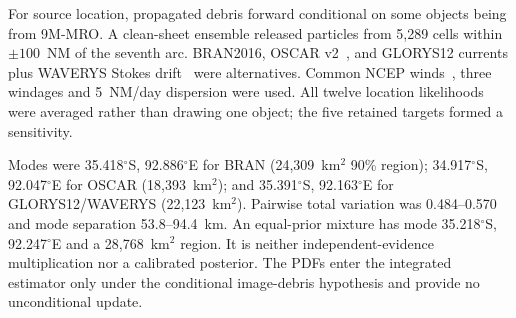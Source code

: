 For source location, \citet{griffin2017drift} propagated debris forward
conditional on some objects being from 9M-MRO. A clean-sheet ensemble released
particles from 5,289 cells within $\pm100$~NM of the seventh arc. BRAN2016,
OSCAR v2~\citep{dohan2021oscar}, and GLORYS12 currents plus WAVERYS Stokes
drift~\citep{copernicus2023glorys12,copernicus2024waverys} were alternatives.
Common NCEP winds~\citep{kalnay1996reanalysis}, three windages and 5~NM/day
dispersion were used. All twelve location likelihoods were averaged rather than
drawing one object; the five retained targets formed a sensitivity.

Modes were 35.418$^{\circ}$S, 92.886$^{\circ}$E for BRAN
(24,309~km$^2$ 90\% region); 34.917$^{\circ}$S, 92.047$^{\circ}$E for OSCAR
(18,393~km$^2$); and 35.391$^{\circ}$S, 92.163$^{\circ}$E for
GLORYS12/WAVERYS (22,123~km$^2$). Pairwise total variation was 0.484--0.570 and
mode separation 53.8--94.4~km. An equal-prior mixture has mode
35.218$^{\circ}$S, 92.247$^{\circ}$E and a 28,768~km$^2$ region. It is
neither independent-evidence multiplication nor a calibrated posterior. The
PDFs enter the integrated estimator only under the conditional image-debris
hypothesis and provide no unconditional update.
